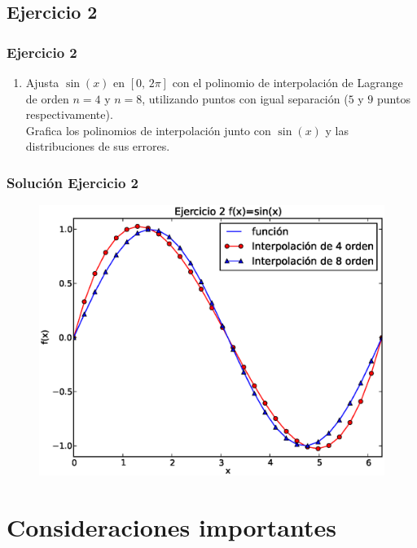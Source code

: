 \documentclass[12pt]{beamer}
\begin{document}
\subsection{Ejercicio 2}

\begin{frame}
\frametitle{Ejercicio 2}
\begin{enumerate}
\conti
\item Ajusta $\sin(x)$ en $[0, \, 2\pi]$ con el polinomio de interpolación de Lagrange de orden $n = 4$ y $n = 8$, utilizando puntos con igual separación ($5$ y $9$ puntos respectivamente). 
\\
\bigskip
Grafica los polinomios de interpolación junto con $\sin(x)$ y las distribuciones de sus errores.
\end{enumerate}
\end{frame}
\begin{frame}
\frametitle{Solución Ejercicio 2}
\begin{figure}
	\centering
	\includegraphics[scale=0.45]{Imagenes/ejercicioTema21_2.eps} 
\end{figure}
\end{frame}

\section{Consideraciones importantes}
\end{document}
